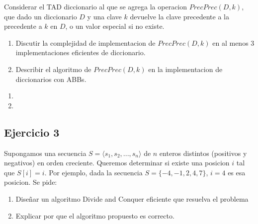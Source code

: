 \documentclass[10pt, a4paper]{article}
\begin{document}
Considerar el TAD diccionario al que se agrega la operacion $PrecPrec(D,k)$, que dado un diccionario $D$ y una clave $k$ devuelve la clave precedente a la precedente a $k$ en $D$, o un valor especial si no existe.
\begin{enumerate}
 \item Discutir la complejidad de implementacion de $PrecPrec(D,k)$ en al menos $3$ implementaciones eficientes de diccionario.
 \item Describir el algoritmo de $PrecPrec(D,k)$ en la implementacion de diccionarios con ABBs.
\end{enumerate}

\begin{enumerate}
 \item 
 \item
\end{enumerate}


\subsection*{Ejercicio 3}

Supongamos una secuencia $S = \langle s_1, s_2, ..., s_n \rangle$ de $n$ enteros distintos (positivos y negativos) en orden creciente. Queremos determinar si existe una posicion $i$ tal que $S[i]=i$. Por ejemplo, dada la secuencia $S = \{-4,-1,2,4,7\}$, $i=4$ es esa posicion. Se pide:
\begin{enumerate}
 \item Dise\~nar un algoritmo Divide and Conquer eficiente que resuelva el problema
 \item Explicar por que el algoritmo propuesto es correcto.
\end{enumerate}
\end{document}

